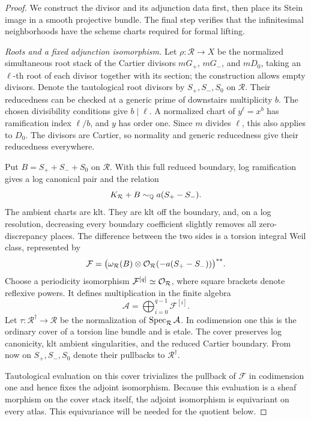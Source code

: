 \begin{proof}
We construct the divisor and its adjunction data first, then place
its Stein image in a smooth projective bundle.  The final step
verifies that the infinitesimal neighborhoods have the scheme
charts required for formal lifting.

\smallskip\noindent\emph{Roots and a fixed adjunction isomorphism.}
Let $\rho:\mathcal R\to X$ be the normalized simultaneous root stack of the Cartier
divisors $mG_+$, $mG_-$, and $mD_0$, taking an $\ell$-th root of
each divisor together with its section; the construction allows
empty divisors.  Denote the tautological root divisors by
$S_+,S_-,S_0$ on $\mathcal R$. Their reducedness can be checked
at a generic prime of downstairs multiplicity $b$. The chosen
divisibility conditions give $b\mid\ell$. A normalized chart of
$y^\ell=x^b$ has ramification index $\ell/b$, and $y$ has order
one.  Since $m$ divides $\ell$, this also applies to $D_0$.
The divisors are Cartier, so normality and generic reducedness
give their reducedness everywhere.

Put $B=S_++S_-+S_0$ on $\mathcal R$. With this full reduced
boundary, log ramification gives a log
canonical pair and the relation
\[
 K_{\mathcal R}+B\sim_{\mathbb{Q}}a(S_+-S_-).
\]
The ambient charts are klt.  They are klt off the boundary,
and, on a log resolution, decreasing every boundary coefficient
slightly removes all zero-discrepancy places. The difference
between the two sides is a torsion integral Weil class, represented by
\[
 \mathcal F=
 \bigl(\omega_{\mathcal R}(B)
       \otimes\mathcal{O}_{\mathcal R}(-a(S_+-S_-))\bigr)^{**}.
\]
Choose a periodicity isomorphism $\mathcal F^{[q]}\simeq\mathcal{O}_{\mathcal R}$,
where square brackets denote reflexive powers. It defines multiplication
in the finite algebra
\[
 \mathcal A=\bigoplus_{i=0}^{q-1}\mathcal F^{[i]}.
\]
Let $\tau:\mathcal R^\dagger\to\mathcal R$ be the normalization
of $\operatorname{Spec}_{\mathcal R}\mathcal A$. In codimension one this is
the ordinary cover of a torsion line bundle and is etale. The
cover preserves log canonicity, klt ambient singularities, and
the reduced Cartier boundary. From now on $S_+,S_-,S_0$ denote
their pullbacks to $\mathcal R^\dagger$.

Tautological evaluation on this cover trivializes the pullback
of $\mathcal F$ in codimension one and hence fixes the adjoint
isomorphism. Because this evaluation is a sheaf morphism
on the cover stack itself, the adjoint isomorphism is equivariant
on every atlas.  This equivariance will be needed for the
quotient below.


\end{proof}
